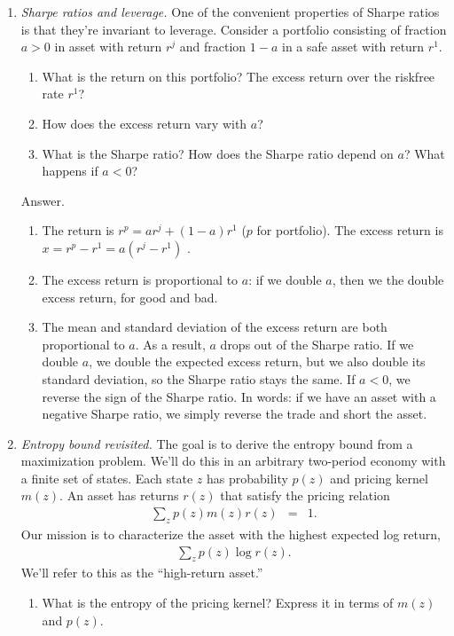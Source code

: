 \documentclass[11pt]{article}
\begin{document}
\begin{enumerate}
\item {\it Sharpe ratios and leverage.\/}
One of the convenient properties of Sharpe ratios is that they're invariant to leverage.
Consider a portfolio consisting of fraction $a>0$ in asset with return $r^j$ and
fraction $1-a$ in a safe asset with return $r^1$.
%
\begin{enumerate}
\item What is the return on this portfolio?
The excess return over the riskfree rate $r^1$?
\item How does the excess return vary with $a$?
\item What is the Sharpe ratio?
How does the Sharpe ratio depend on $a$?
What happens if $a<0$?
\end{enumerate}
%
Answer.
\begin{enumerate}
\item The return is $r^p = a r^j + (1-a) r^1$ ($p$ for portfolio).
The excess return is $x = r^p - r^1 = a (r^j - r^1)$ .
\item The excess return is proportional to $a$:  if we double $a$,
then we the double excess return, for good and bad.
\item The mean and standard deviation of the excess return
are both proportional to $a$.
As a result, $a$ drops out of the Sharpe ratio.
If we double $a$, we double the expected excess return,
but we also double its standard deviation,
so the Sharpe ratio stays the same.
If $a<0$, we reverse the sign of the Sharpe ratio.
In words:  if we have an asset with a negative Sharpe ratio, 
we simply reverse the trade and short the asset.
\end{enumerate}

\item {\it Entropy bound revisited.\/}
The goal is to derive the entropy bound from a maximization problem.
We'll do this in an arbitrary two-period economy with a finite set of states.
Each state $z$ has probability $p(z)$
and pricing kernel $m(z)$.
An asset has returns $r(z)$ that satisfy the pricing relation
\begin{eqnarray}
    \sum_z p(z) m(z) r(z) &=& 1.
    \label{eq:pricing-relation}
\end{eqnarray}
Our mission is to characterize the asset with the highest expected log return,
\begin{eqnarray*}
    \sum_z p(z) \log r(z) .
\end{eqnarray*}
We'll refer to this as the ``high-return asset.''
%
\begin{enumerate}
\item What is the entropy of the pricing kernel?
Express it in terms of $m(z)$ and $p(z)$.


\end{enumerate}
\end{enumerate}
\end{document}
